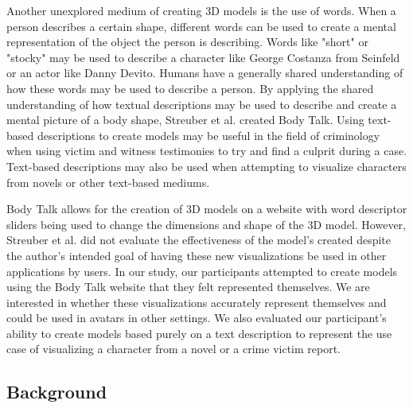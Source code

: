 \documentclass[journal]{vgtc}                %
\begin{document}
\noindent Another unexplored medium of creating 3D models is the use of words. When a person describes a certain shape, different words can be used to
create a mental representation of the object the person is describing. Words like "short" or "stocky" may be used to describe a character
like George Costanza from Seinfeld or an actor like Danny Devito. Humans have a generally shared understanding of how these words may be used
to describe a person. By applying the shared understanding of how textual descriptions may be used to describe and create a mental picture of
a body shape, Streuber et al. created Body Talk\cite{Streuber:2016:SIGGRAPH}. Using text-based descriptions to create models may be useful
in the field of criminology when using victim and witness testimonies to try and find a culprit during a case. Text-based descriptions may
also be used when attempting to visualize characters from novels or other text-based mediums. \newline

\noindent Body Talk allows for the creation of 3D models on a website\cite{bodytalk:website} with word descriptor sliders being used to change the
dimensions
and shape of the 3D model. However, Streuber et al. did not evaluate the effectiveness of the model's created despite the author's intended goal
of having these new visualizations be used in other applications by users. In our study, our participants attempted to create models using
the Body Talk website that they felt represented themselves. We are interested in whether these visualizations accurately represent themselves
and could be used in avatars in other settings. We also evaluated our participant's ability to create models based purely on a text
description to represent the use case of visualizing a character from a novel or a crime victim report.

\subsection{Background}
\end{document}
